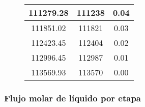 \begin{figure}[H]
\begin{tabular}{|c|c|c|}
        \hline
        111279.28       & 111238         & 0.04                         \\
        \hline
        111851.02       & 111821         & 0.03                         \\
        \hline
        112423.45       & 112404         & 0.02                         \\
        \hline
        112996.45       & 112987         & 0.01                         \\
        \hline
        113569.93       & 113570         & 0.00                         \\
        \hline
    \end{tabular}
    \normalsize
\end{figure}

\newpage

\subsubsection{Flujo molar de líquido por etapa}

